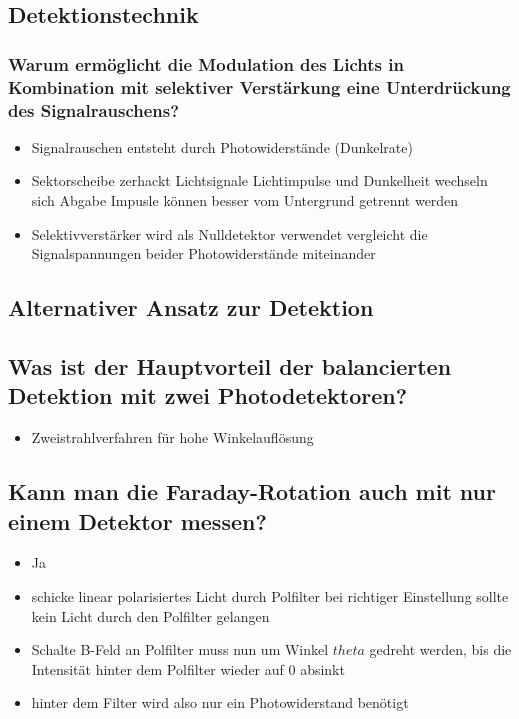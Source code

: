 \subsection{Detektionstechnik}
\subsubsection*{Warum ermöglicht die Modulation des Lichts in Kombination mit selektiver Verstärkung eine Unterdrückung des Signalrauschens?} %
\begin{itemize}
    \item Signalrauschen entsteht durch Photowiderstände (Dunkelrate)
    \item Sektorscheibe zerhackt Lichtsignale
        \to Lichtimpulse und Dunkelheit wechseln sich Abgabe
        \iff Impusle können besser vom Untergrund getrennt werden
    \item Selektivverstärker wird als Nulldetektor verwendet
        \to vergleicht die Signalspannungen beider Photowiderstände miteinander
\end{itemize}


\subsection{Alternativer Ansatz zur Detektion} 
\subsection*{Was ist der Hauptvorteil der balancierten Detektion mit zwei Photodetektoren?} %
\begin{itemize}
    \item Zweistrahlverfahren für hohe Winkelauflösung
\end{itemize}
\subsection*{Kann man die Faraday-Rotation auch mit nur einem Detektor messen?} %
\begin{itemize}
    \item Ja
    \item schicke linear polarisiertes Licht durch Polfilter
        \to bei richtiger Einstellung sollte kein Licht durch den Polfilter gelangen
    \item Schalte B-Feld an 
        \to Polfilter muss nun um Winkel $theta$ gedreht werden, bis die Intensität hinter dem Polfilter wieder auf 0 absinkt
    \item hinter dem Filter wird also nur ein Photowiderstand benötigt 
\end{itemize}